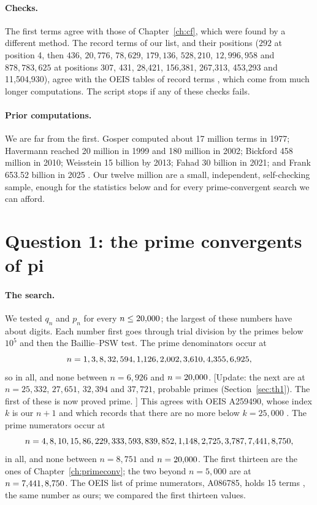 \paragraph{Checks.} The first \NT{} terms agree with those of Chapter~\ref{ch:cf}, which were found by a different method. The record terms of our list, and their positions ($292$ at position 4, then $436$, $20{,}776$, $78{,}629$, $179{,}136$, $528{,}210$, $12{,}996{,}958$ and $878{,}783{,}625$ at positions 307, 431, 28,421, 156,381, 267,313, 453,293 and 11,504,930), agree with the OEIS tables of record terms \citep{OEIS_A033089}, which come from much longer computations. The script stops if any of these checks fails.

\paragraph{Prior computations.} We are far from the first. Gosper computed about 17 million terms in 1977; Havermann reached 20 million in 1999 and 180 million in 2002; Bickford 458 million in 2010; Weisstein 15 billion by 2013; Fahad 30 billion in 2021; and Frank 653.52 billion in 2025 \citep{MathWorldPiCF,OEIS_A001203}. Our twelve million are a small, independent, self-checking sample, enough for the statistics below and for every prime-convergent search we can afford.

\section{Question 1: the prime convergents of pi}\label{sec:oq1}

\paragraph{The search.} We tested $q_n$ and $p_n$ for every $n \le 20{,}000$; the largest of these numbers have about \OqPiDigitsN{} digits. Each number first goes through trial division by the primes below $10^5$ and then the Baillie--PSW test. The prime denominators occur at
\[
  n = 1, 3, 8, 32, 594, 1{,}126, 2{,}002, 3{,}610, 4{,}355, 6{,}925,
\]
so \OqPiQn{} in all, and none between $n = 6{,}926$ and $n = 20{,}000$. [Update: the next are at $n = 25{,}332$, $27{,}651$, $32{,}394$ and $37{,}721$, probable primes (Section~\ref{sec:th1}). \addedon{\revC} The first of these is now proved prime. \addedon{\revG}] This agrees with OEIS A259490, whose index $k$ is our $n + 1$ and which records that there are no more below $k = 25{,}000$ \citep{OEIS_A259490}. The prime numerators occur at
\[
  n = 4, 8, 10, 15, 86, 229, 333, 593, 839, 852, 1{,}148, 2{,}725, 3{,}787, 7{,}441, 8{,}750,
\]
\OqPiPn{} in all, and none between $n = 8{,}751$ and $n = 20{,}000$. The first thirteen are the ones of Chapter~\ref{ch:primeconv}; the two beyond $n = 5{,}000$ are at $n = 7{,}441, 8{,}750$. The OEIS list of prime numerators, A086785, holds 15 terms \citep{OEIS_A086785}, the same number as ours; we compared the first thirteen values.

